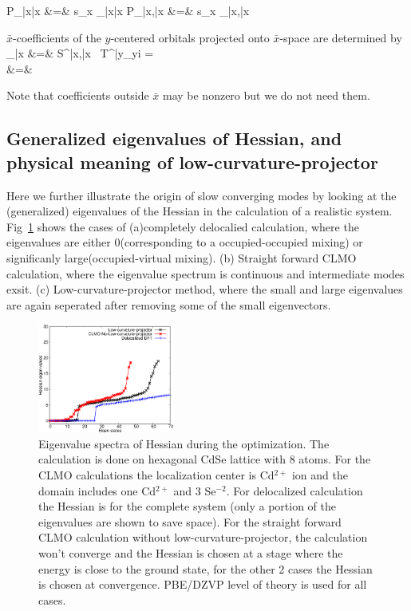 \documentclass[aps,prl,twocolumn,reprint,amsmath,amssymb]{revtex4-1}
\begin{document}
%
\small {
\bea
P_{\bar{x}\bar{x}} &=& s_x _{\bar{x}\bar{x}} 
\eea 
%
\bea
P_{\bar{x}\mu,\bar{x}\nu} &=& s_x _{\bar{x}\mu,\bar{x}\nu} 
\eea 

$\bar{x}$-coefficients of the $y$-centered orbitals projected onto $\bar{x}$-space are determined by
%
\bea
{}_{\bar{x}}   &=&  S^{\bar{x}\mu,\bar{x}\nu} \, {T^{\bar{y}\lambda}}_{yi} = \nonumber \\
 &=&  
\eea 
}
%
Note that coefficients outside $\bar{x}$ may be nonzero but we do not need them.

\subsection{Generalized eigenvalues of Hessian, and physical meaning of low-curvature-projector}

Here we further illustrate the origin of slow converging modes by looking at the (generalized) eigenvalues of the Hessian in the calculation of a realistic system. Fig~\ref{sfig:hesseig} shows the cases of (a)completely delocalied calculation, where the eigenvalues are either 0(corresponding to a occupied-occupied mixing) or significanly large(occupied-virtual mixing). (b) Straight forward CLMO calculation, where the eigenvalue spectrum is continuous and intermediate modes exsit. (c) Low-curvature-projector method, where the small and large eigenvalues are again seperated after removing some of the small eigenvectors.

\begin{figure}
\centering
\includegraphics[width=0.4\textwidth]{Hesseig}
\caption{Eigenvalue spectra of Hessian during the optimization. The calculation is done on hexagonal CdSe lattice with 8 atoms. For the CLMO calculations the localization center is Cd$^{2+}$ ion and the domain includes one Cd$^{2+}$ and 3 Se$^{-2}$. For delocalized calculation the Hessian is for the complete system (only a portion of the eigenvalues are shown to save space). For the straight forward CLMO calculation without low-curvature-projector, the calculation won't converge and the Hessian is chosen at a stage where the energy is close to the ground state, for the other 2 cases the Hessian is chosen at convergence. PBE/DZVP level of theory is used for all cases.}
\label{sfig:hesseig}
\end{figure}
\end{document}
